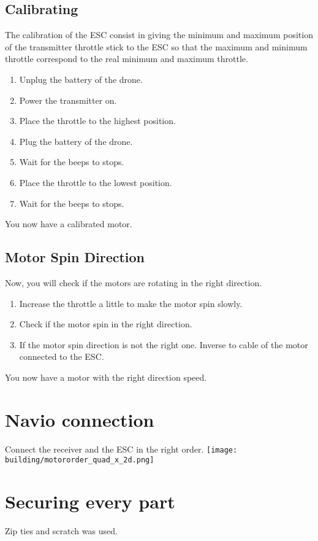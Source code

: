 \subsection{Calibrating}
The calibration of the ESC consist in giving the minimum and maximum position of the transmitter throttle stick to the ESC so that the maximum and minimum throttle correspond to the real minimum and maximum throttle.

\begin{enumerate}
    \item Unplug the battery of the drone.
    \item Power the transmitter on.
    \item Place the throttle to the highest position.
    \item Plug the battery of the drone.
    \item Wait for the beeps to stops.
    \item Place the throttle to the lowest position.
    \item Wait for the beeps to stops.
\end{enumerate}
You now have a calibrated motor.


\subsection{Motor Spin Direction}
Now, you will check if the motors are rotating in the right direction.

\begin{enumerate}
    \item Increase the throttle a little to make the motor spin slowly.
    \item Check if the motor spin in the right direction.
    \item If the motor spin direction is not the right one. Inverse to cable of the motor connected to the ESC.
\end{enumerate}

You now have a motor with the right direction speed.

\section{Navio connection}
Connect the receiver and the ESC in the right order.
\texttt{[image: building/motororder\_quad\_x\_2d.png]}

\section{Securing every part}
Zip ties and scratch was used.


